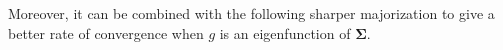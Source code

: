 \documentclass[twoside,11pt]{book}
\newtheorem{theorem}{Theorem}
\newtheorem{proposition}{Proposition}
\numberwithin{theorem}{chapter}
\numberwithin{definition}{chapter}
\numberwithin{proposition}{chapter}
\numberwithin{corollary}{chapter}
\numberwithin{example}{chapter}
\numberwithin{lemma}{chapter}
\numberwithin{assumption}{chapter}
\numberwithin{equation}{chapter}
\numberwithin{figure}{chapter}
\DeclareMathOperator{\Det}{Det}
\DeclareMathOperator{\DPP}{\mathrm{DPP}}
\DeclareMathOperator{\EX}{\mathbb{E}}
\begin{document}


Moreover, it can be combined with the following sharper majorization to give a better rate of convergence when $g$ is an eigenfunction of $\bm{\Sigma}$.
\end{document}
